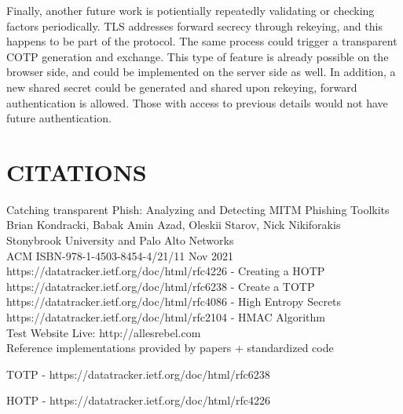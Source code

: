 \documentclass[a4paper, 11pt]{article} 				%
\begin{document}
Finally, another future work is potientially repeatedly validating or checking factors periodically. TLS addresses forward secrecy through rekeying, and this happens to be part of the protocol. The same process could trigger a transparent COTP generation and exchange. This type of feature is already possible on the browser side, and could be implemented on the server side as well. In addition, a new shared secret could be generated and shared upon rekeying, forward authentication is allowed. Those with access to previous details would not have future authentication. 

\section{CITATIONS } 	%

\noindent
[1]Catching transparent Phish: Analyzing and Detecting MITM Phishing Toolkits\\
\noindent 
Brian Kondracki, Babak Amin Azad, Oleskii Starov, Nick Nikiforakis\\
Stonybrook University and Palo Alto Networks\\ 
\noindent
ACM ISBN-978-1-4503-8454-4/21/11 Nov 2021\\

\noindent
[2]https://datatracker.ietf.org/doc/html/rfc4226 - Creating a HOTP\\

\noindent
[3]https://datatracker.ietf.org/doc/html/rfc6238 - Create a TOTP\\ 

\noindent
[4]https://datatracker.ietf.org/doc/html/rfc4086 - High Entropy Secrets\\

\noindent
[5]https://datatracker.ietf.org/doc/html/rfc2104 - HMAC Algorithm\\

\noindent
[6]Test Website Live: http://allesrebel.com\\ 

\noindent
Reference implementations provided by papers + standardized code

\noindent
[7]TOTP - https://datatracker.ietf.org/doc/html/rfc6238

\noindent
[8]HOTP - https://datatracker.ietf.org/doc/html/rfc4226 
\end{document}
